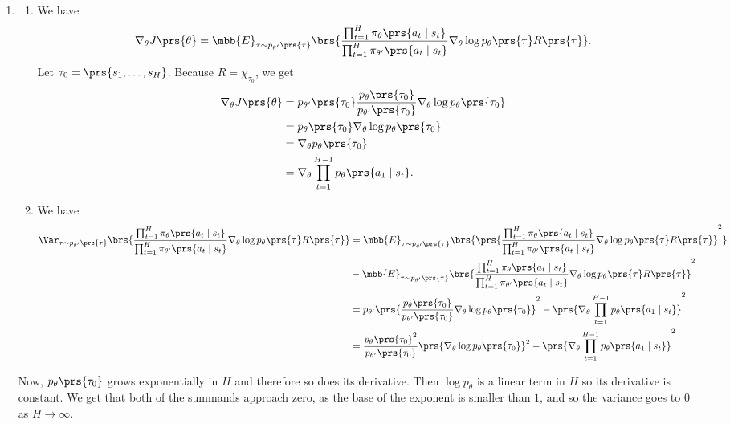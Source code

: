 \documentclass[10pt]{article}
\theoremstyle{definition}
\begin{document}
\begin{enumerate}
\item
\begin{enumerate}[label=(\alph*)]
\item
We have
\begin{align*}
\nabla_\theta J\prs{\theta} = \mbb{E}_{\tau \sim p_{\theta'}\prs{\tau}}\brs{\frac{\prod_{t=1}^H \pi_\theta\prs{a_t \mid s_t}}{\prod_{t=1}^H\pi_{\theta'}\prs{a_t \mid s_t}} \nabla_\theta \log p_\theta\prs{\tau} R\prs{\tau}} \text{.}
\end{align*}
Let $\tau_0 = \prs{s_1, \ldots, s_H}$. Because $R = \chi_{\tau_0}$, we get
\begin{align*}
\nabla_\theta J\prs{\theta} &= p_{\theta'}\prs{\tau_0} \frac{p_{\theta}\prs{\tau_0}}{p_{\theta'}\prs{\tau_0}} \nabla_\theta \log p_\theta\prs{\tau_0}
\\&=
p_\theta\prs{\tau_0} \nabla_\theta \log p_\theta\prs{\tau_0}
\\&=
\nabla_\theta p_\theta\prs{\tau_0}
\\&=
\nabla_\theta \prod_{t=1}^{H-1} p_\theta\prs{a_1 \mid s_t} \text{.}
\end{align*}
\item
We have
\begin{align*}
\Var_{\tau \sim p_{\theta'}\prs{\tau}}\brs{\frac{\prod_{t=1}^H \pi_\theta\prs{a_t \mid s_t}}{\prod_{t=1}^H\pi_{\theta'}\prs{a_t \mid s_t}} \nabla_\theta \log p_\theta\prs{\tau} R\prs{\tau}}
&=
\mbb{E}_{\tau \sim p_{\theta'}\prs{\tau}}\brs{\prs{\frac{\prod_{t=1}^H \pi_\theta\prs{a_t \mid s_t}}{\prod_{t=1}^H\pi_{\theta'}\prs{a_t \mid s_t}} \nabla_\theta \log p_\theta\prs{\tau} R\prs{\tau}}^2}
\\&
-\mbb{E}_{\tau \sim p_{\theta'}\prs{\tau}}\brs{\frac{\prod_{t=1}^H \pi_\theta\prs{a_t \mid s_t}}{\prod_{t=1}^H\pi_{\theta'}\prs{a_t \mid s_t}} \nabla_\theta \log p_\theta\prs{\tau} R\prs{\tau}}^2
\\&=
p_{\theta'} \prs{\frac{p_\theta\prs{\tau_0}}{p_{\theta'}\prs{\tau_0}} \nabla_\theta \log p_\theta\prs{\tau_0}}^2 - \prs{\nabla_\theta \prod_{t=1}^{H-1} p_\theta\prs{a_1 \mid s_t}}^2
\\&=
\frac{p_\theta\prs{\tau_0}^2}{p_{\theta'}\prs{\tau_0}} \prs{\nabla_\theta \log p_\theta\prs{\tau_0}}^2 - \prs{\nabla_\theta \prod_{t=1}^{H-1} p_\theta\prs{a_1 \mid s_t}}^2
\end{align*}
\end{enumerate}
Now, $p_\theta\prs{\tau_0}$ grows exponentially in $H$ and therefore so does its derivative. Then $\log p_\theta$ is a linear term in $H$ so its derivative is constant. We get that both of the summands approach zero, as the base of the exponent is smaller than $1$, and so the variance goes to $0$ as $H \rightarrow \infty$.
\end{enumerate}

\printbibliography
\printindex
\end{document}
